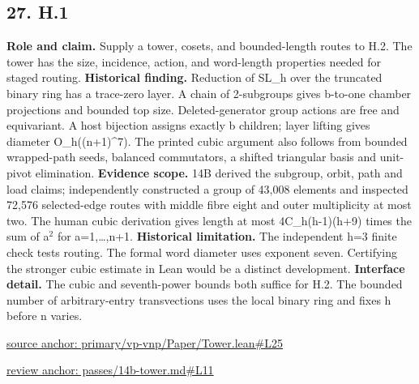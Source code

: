 \documentclass[11pt,letterpaper]{article}
\theoremstyle{definition}\newtheorem{definition}[theorem]{Definition}\newtheorem{example}[theorem]{Example}
\theoremstyle{remark}\newtheorem{remark}[theorem]{Remark}
\begin{document}
\subsection*{27. H.1}
\textbf{Role and claim.} Supply a tower, cosets, and bounded-length routes to H.2. The tower has the size, incidence, action, and word-length properties needed for staged routing.
\textbf{Historical finding.} Reduction of SL\_h over the truncated binary ring has a trace-zero layer. A chain of 2-subgroups gives b-to-one chamber projections and bounded top size. Deleted-generator group actions are free and equivariant. A host bijection assigns exactly b children; layer lifting gives diameter O\_h((n+1)\textasciicircum{}7). The printed cubic argument also follows from bounded wrapped-path seeds, balanced commutators, a shifted triangular basis and unit-pivot elimination.
\textbf{Evidence scope.} 14B derived the subgroup, orbit, path and load claims; independently constructed a group of 43,008 elements and inspected 72,576 selected-edge routes with middle fibre eight and outer multiplicity at most two. The human cubic derivation gives length at most 4C\_h(h-1)(h+9) times the sum of a\ensuremath{{}^2} for a=1,…,n+1.
\textbf{Historical limitation.} The independent h=3 finite check tests routing. The formal word diameter uses exponent seven. Certifying the stronger cubic estimate in Lean would be a distinct development.
\textbf{Interface detail.} The cubic and seventh-power bounds both suffice for H.2. The bounded number of arbitrary-entry transvections uses the local binary ring and fixes h before n varies.
\par\href{https://github.com/nousentllc/VP-VNP-Review/blob/8a7976933b6b2b4ffda1ad3a0dfb5fc6b6f023e8/primary/vp-vnp/Paper/Tower.lean\#L25}{source anchor: primary/vp-vnp/Paper/Tower.lean\#L25}
\par\href{https://github.com/nousentllc/VP-VNP-Review/blob/8a7976933b6b2b4ffda1ad3a0dfb5fc6b6f023e8/passes/14b-tower.md\#L11}{review anchor: passes/14b-tower.md\#L11}
\goodbreak
{}
\hypertarget{claim.28}{}
\end{document}
